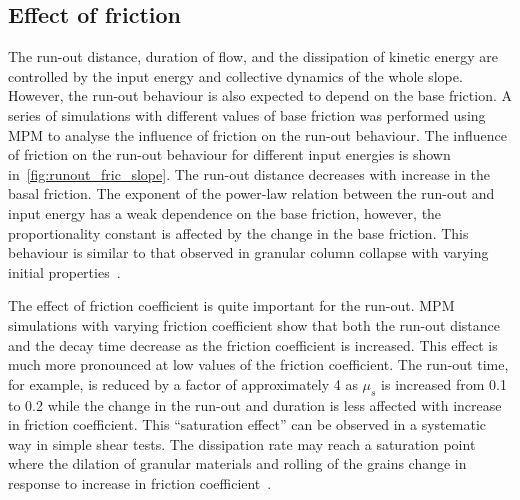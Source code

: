 \documentclass[3p,times,procedia,number]{elsarticle}
\begin{document}
\subsection{Effect of friction}
\label{sec:parameters}

The run-out distance, duration of flow, and the dissipation of kinetic energy 
are controlled by the input energy and collective dynamics of the whole slope. 
However, the run-out behaviour is also expected to depend on the base friction. 
A series of simulations with different values of base friction was performed 
using MPM to analyse the influence of friction on the run-out behaviour. The 
influence of friction on the run-out behaviour for different input energies is 
shown in~\cref{fig:runout_fric_slope}. The run-out distance decreases with 
increase in the basal friction. The exponent of the 
power-law relation between the run-out and input energy has a weak dependence 
on the base friction, however, the proportionality constant is affected by the 
change in the base friction. This behaviour is similar to that observed in 
granular column collapse with varying initial 
properties~\citep{Balmforth2005,Lajeunesse2005}. 

The effect of friction coefficient is quite important for the run-out. MPM
simulations with varying friction coefficient show that both the run-out
distance and the decay time decrease as the friction coefficient is increased.
This effect is much more pronounced at low values of the friction coefficient.
The run-out time, for example, is reduced by a factor of approximately 4 as
$\mu_s$ is increased from 0.1 to 0.2 while the change in the run-out and
duration is less affected with increase in friction coefficient. This
``saturation effect'' can be observed in a systematic way in simple shear
tests. The dissipation rate may reach a saturation point where the dilation of
granular materials and rolling of the grains change in response to increase in
friction coefficient~\citep{Estrada2008}.
\end{document}
